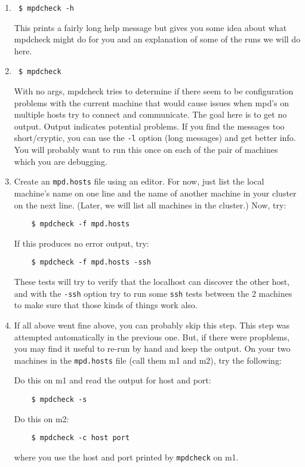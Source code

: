 \documentclass[dvipdfm,11pt]{article}
\begin{document}
\begin{enumerate}
\item \verb+ $ mpdcheck -h +

This prints a fairly long help message but gives you some
idea about what mpdcheck might do for you and an
explanation of some of the runs we will do here.

\item \verb+ $ mpdcheck +

With no args, mpdcheck tries to determine if there seem to
be configuration problems with the current machine that
would cause issues when mpd's on multiple hosts try to
connect and communicate.  The goal here is to get no
output.  Output indicates potential problems.  If you find
the messages too short/cryptic, you can use the \texttt{-l} option
(long messages) and get better info.  You will probably want to run
this once on each of the pair of machines which you are debugging.

\item Create an \texttt{mpd.hosts} file using an editor.  For now, just
    list the local machine's name on one line and the name of
    another machine in your cluster on the next line.  (Later,
    we will list all machines in the cluster.)  Now, try:
\begin{verbatim}
    $ mpdcheck -f mpd.hosts
\end{verbatim}
    If this produces no error output, try:
\begin{verbatim}
    $ mpdcheck -f mpd.hosts -ssh
\end{verbatim}
These tests will try to verify that the localhost can
discover the other host, and with the \texttt{-ssh} option try to
run some \texttt{ssh} tests between the 2 machines to make sure
that those kinds of things work also.

\item If all above went fine above, you can probably skip this step.
This step was attempted automatically in the previous one.  But,
if there were propblems, you may find it useful to re-run by hand and
keep the output.  On your two machines in the \texttt{mpd.hosts}
file (call them m1 and m2), try the following:

Do this on m1 and read the output for host and port:
\begin{verbatim}
    $ mpdcheck -s
\end{verbatim}
Do this on m2:
\begin{verbatim}
    $ mpdcheck -c host port
\end{verbatim}
where you use the host and port printed by \texttt{mpdcheck} on m1.


\end{enumerate}
\end{document}
